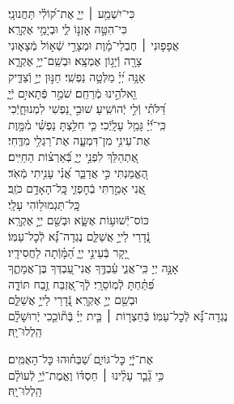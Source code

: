 \documentclass[twoside, openany, parskip=half, 11pt]{book}
\begin{document}
{\begin{narrow}
\\
כִּי־יִשְׁמַ֥ע ׀ יְיָ֑ \hfill אֶת־ק֝וֹלִ֗י תַּחֲנוּנָֽי׃ \\
כִּי־הִטָּ֣ה אׇזְנ֣וֹ לִ֑י \hfill וּבְיָמַ֥י אֶקְרָֽא׃ \\
אֲפָפ֤וּנִי ׀ חֶבְלֵי־מָ֗וֶת \hfill וּמְצָרֵ֣י שְֿׁא֣וֹל מְֿצָא֑וּנִי\\ צָרָ֖ה וְֿיָג֣וֹן אֶמְצָֽא׃ \hfill
וּבְשֵֽׁם־יְיָ֥ אֶקְרָ֑א\\ אָנָּ֥ה יְ֝יָ֗ מַלְּטָ֥ה נַפְשִֽׁי׃ \hfill
חַנּ֣וּן יְיָ֣ וְֿצַדִּ֑יק\\ וֵ֖אלֹהֵ֣ינוּ מְֿרַחֵֽם׃ \hfill
שֹׁמֵ֣ר פְּֿתָאיִ֣ם יְֿיָ֑\\ דַּ֝לֹּתִ֗י וְֿלִ֣י יְֿהוֹשִֽׁיעַ׃ \hfill
שׁוּבִ֣י נַ֭פְשִׁי לִמְנוּחָ֑יְֿכִי\\ כִּֽי־יְֿ֝יָ֗ גָּמַ֥ל עָלָֽיְֿכִי׃ \hfill
כִּ֤י חִלַּ֥צְתָּ נַפְשִׁ֗י מִ֫מָּ֥וֶת\\ אֶת־עֵינִ֥י מִן־דִּמְעָ֑ה \hfill אֶת־רַגְלִ֥י מִדֶּֽחִי׃ \\
אֶ֭תְהַלֵּךְ לִפְנֵ֣י יְיָ֑ \hfill בְּֿ֝אַרְצ֗וֹת הַחַיִּֽים׃ \\
הֶ֭אֱמַנְתִּי כִּ֣י אֲדַבֵּ֑ר \hfill אֲ֝נִ֗י עָנִ֥יתִי מְֿאֹֽד׃ \\
אֲ֭נִי אָמַ֣רְתִּי בְֿחׇפְזִ֑י \hfill כׇּֽל־הָאָדָ֥ם כֹּזֵֽב׃ \\

 \hfill
כׇּֽל־תַּגְמוּל֥וֹהִי עָלָֽי׃ \\
כּוֹס־יְֿשׁוּע֥וֹת אֶשָּׂ֑א \hfill וּבְשֵׁ֖ם יְיָ֣ אֶקְרָֽא׃ \\
נְֿ֭דָרַי לַייָ֣ אֲשַׁלֵּ֑ם \hfill נֶגְדָה־נָּ֗֝א לְֿכׇל־עַמּֽוֹ׃ \\
יָ֭קָר בְּֿעֵינֵ֣י יְיָ֑ \hfill הַ֝מָּ֗וְֿתָה לַחֲסִידָֽיו׃ \\
אָנָּ֣ה יְיָ כִּֽי־אֲנִ֢י עַ֫בְדֶּ֥ךָ \hfill אֲנִי־עַ֭בְדְּךָ בֶּן־אֲמָתֶ֑ךָ\\ פִּ֝תַּ֗חְתָּ לְֿמֽוֹסֵרָֽי׃ \hfill
לְֽֿךָ־אֶ֭זְבַּח זֶ֣בַח תּוֹדָ֑ה\\ וּבְשֵׁ֖ם יְיָ֣ אֶקְרָֽא׃ \hfill
נְֿ֭דָרַי לַייָ֣ אֲשַׁלֵּ֑ם \\ נֶגְדָה־נָּ֗֝א לְֿכׇל־עַמּֽוֹ׃ \hfill
בְּֿחַצְר֤וֹת ׀ בֵּ֤ית יְיָ֗ בְּֽֿת֘וֹכֵ֤כִי יְֽֿרוּשָׁלָ֗‍ִם\\
הַֽלְלוּ־יָֽהּ׃ \hfill \break



אֶת־יְֿיָ֭ כׇּל־גּוֹיִ֑ם \hfill שַׁ֝בְּח֗וּהוּ כׇּל־הָאֻמִּֽים׃ \\
כִּ֥י גָ֘בַ֤ר עָלֵ֨ינוּ ׀ חַסְדּ֗וֹ \hfill וֶאֱמֶת־יְֿיָ֥ לְֿעוֹלָ֗ם\\
הַֽלְלוּ־יָֽהּ׃ \hfill \break


\end{narrow}}
\end{document}
